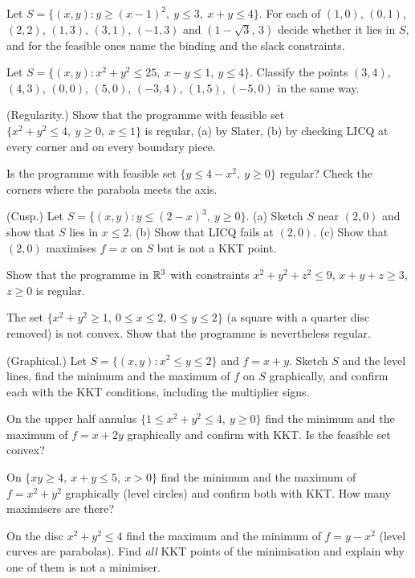 \begin{problems}
  \item Let $S=\{(x,y): y\ge(x-1)^{2},\ y\le3,\ x+y\le4\}$. For each of
        $(1,0)$, $(0,1)$, $(2,2)$, $(1,3)$, $(3,1)$, $(-1,3)$ and
        $(1-\sqrt3,\,3)$ decide whether it lies in $S$, and for the feasible
        ones name the binding and the slack constraints.
  \item Let $S=\{(x,y): x^{2}+y^{2}\le25,\ x-y\le1,\ y\le4\}$. Classify the
        points $(3,4)$, $(4,3)$, $(0,0)$, $(5,0)$, $(-3,4)$, $(1,5)$,
        $(-5,0)$ in the same way.
  \item (Regularity.) Show that the programme with feasible set
        $\{x^{2}+y^{2}\le4,\ y\ge0,\ x\le1\}$ is regular, (a) by Slater,
        (b) by checking LICQ at every corner and on every boundary piece.
  \item Is the programme with feasible set $\{y\le4-x^{2},\ y\ge0\}$
        regular? Check the corners where the parabola meets the axis.
  \item (Cusp.) Let $S=\{(x,y): y\le(2-x)^{3},\ y\ge0\}$. (a) Sketch $S$
        near $(2,0)$ and show that $S$ lies in $x\le2$. (b) Show that LICQ
        fails at $(2,0)$. (c) Show that $(2,0)$ maximises $f=x$ on $S$ but
        is not a KKT point.
  \item Show that the programme in $\mathbb{R}^{3}$ with constraints
        $x^{2}+y^{2}+z^{2}\le9$, $x+y+z\ge3$, $z\ge0$ is regular.
  \item The set $\{x^{2}+y^{2}\ge1,\ 0\le x\le2,\ 0\le y\le2\}$ (a square
        with a quarter disc removed) is not convex. Show that the programme
        is nevertheless regular.
  \item (Graphical.) Let $S=\{(x,y): x^{2}\le y\le2\}$ and $f=x+y$. Sketch
        $S$ and the level lines, find the minimum and the maximum of $f$ on
        $S$ graphically, and confirm each with the KKT conditions, including
        the multiplier signs.
  \item On the upper half annulus $\{1\le x^{2}+y^{2}\le4,\ y\ge0\}$ find
        the minimum and the maximum of $f=x+2y$ graphically and confirm
        with KKT. Is the feasible set convex?
  \item On $\{xy\ge4,\ x+y\le5,\ x>0\}$ find the minimum and the maximum
        of $f=x^{2}+y^{2}$ graphically (level circles) and confirm both with
        KKT. How many maximisers are there?
  \item On the disc $x^{2}+y^{2}\le4$ find the maximum and the minimum of
        $f=y-x^{2}$ (level curves are parabolas). Find \emph{all} KKT points
        of the minimisation and explain why one of them is not a minimiser.

\end{problems}
